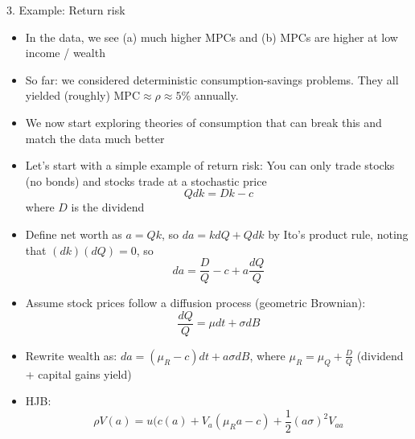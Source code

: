 \documentclass[10pt]{beamer}
\begin{document}
\begin{frame}{3. Example: Return risk}
\begin{itemize}
\item In the data, we see (a) much higher MPCs and (b) MPCs are higher at low income / wealth

\item So far: we considered deterministic consumption-savings problems. They all yielded (roughly) $\text{MPC} \approx \rho \approx 5\%$ annually. 

\item We now start exploring theories of consumption that can break this and match the data much better

\item Let's start with a simple example of return risk: You can only trade stocks (no bonds) and stocks trade at a stochastic price
\begin{equation*}
	Q dk = Dk - c
\end{equation*}
where $D$ is the dividend
\end{itemize}
\end{frame}


\begin{frame}{}
\begin{itemize}
\item Define net worth as $a = Qk$, so $da = k dQ + Q dk$ by Ito's product rule, noting that $(dk)(dQ) = 0$, so 
\begin{equation*}
	da = \frac{D}{Q} - c + a \frac{dQ}{Q}
\end{equation*}

\item Assume stock prices follow a diffusion process (geometric Brownian): 
\begin{equation*}
	\frac{dQ}{Q} = \mu dt + \sigma dB
\end{equation*}

\item Rewrite wealth as: $da = (\mu_R - c) dt + a \sigma dB$, where $\mu_R = \mu_Q + \frac{D}{Q}$ (dividend + capital gains yield)

\item HJB: 
\begin{equation*}
	\rho V(a) = u(c(a) + V_a (\mu_R a - c) + \frac{1}{2} (a \sigma)^2 V_{aa}
\end{equation*}
\end{itemize}
\end{frame}
\end{document}
